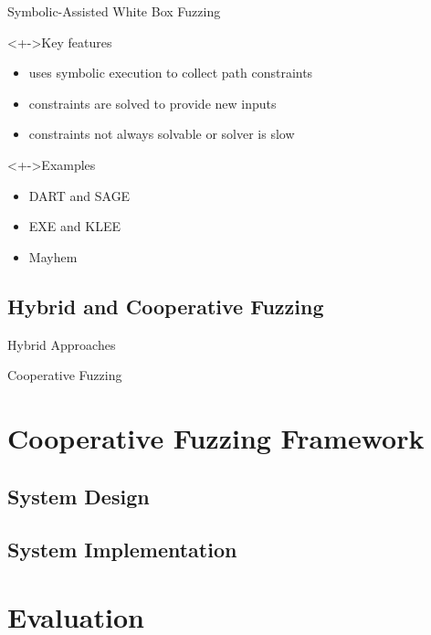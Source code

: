 \documentclass[handout]{beamer}
\begin{document}
\begin{frame}{Symbolic-Assisted White Box Fuzzing}
    \begin{block}<+->{Key features}
        \begin{itemize}[<+->]
            \item{} uses symbolic execution to collect path constraints
            \item{} constraints are solved to provide new inputs
            \item<+-|alert@+> \alert{constraints not always solvable or solver is slow}
        \end{itemize}
    \end{block}
    \begin{exampleblock}<+->{Examples}
        \begin{itemize}[<+->]
            \item{} DART and SAGE
            \item{} EXE and KLEE
            \item{} Mayhem
        \end{itemize}
    \end{exampleblock}
\end{frame}

\subsection{Hybrid and Cooperative Fuzzing}

\begin{frame}{Hybrid Approaches}
\end{frame}

\begin{frame}{Cooperative Fuzzing}
\end{frame}

\section{Cooperative Fuzzing Framework}

\subsection{System Design}

\subsection{System Implementation}

\section{Evaluation}
\end{document}
